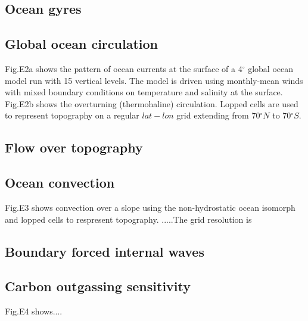\subsection{Ocean gyres}

\subsection{Global ocean circulation}

Fig.E2a shows the pattern of ocean currents at the surface of a 4$^{\circ }$
global ocean model run with 15 vertical levels. The model is driven using
monthly-mean winds with mixed boundary conditions on temperature and
salinity at the surface. Fig.E2b shows the overturning (thermohaline)
circulation. Lopped cells are used to represent topography on a regular $
lat-lon$ grid extending from 70$^{\circ }N$ to 70$^{\circ }S$.

\subsection{Flow over topography}

\subsection{Ocean convection}

Fig.E3 shows convection over a slope using the non-hydrostatic ocean
isomorph and lopped cells to respresent topography. .....The grid resolution
is

\subsection{Boundary forced internal waves}

\subsection{Carbon outgassing sensitivity}

Fig.E4 shows....
